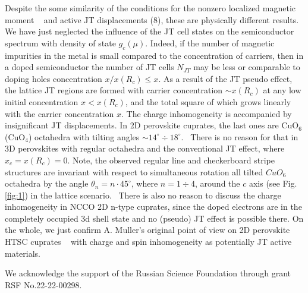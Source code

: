 \documentclass[%
 reprint,
groupedaddress,
 amsmath,amssymb,
 aps,
prb,
]{revtex4-1}
\begin{document}
Despite the some similarity of the conditions for the nonzero localized magnetic moment ~\cite{Anderson1961} and active JT displacements (8), these are physically different results.
We have just neglected the influence of the JT cell states on the semiconductor spectrum with density of state $g_c(\mu)$. Indeed, if the number of magnetic impurities in the metal is small compared to the concentration of carriers, then in a doped semiconductor the number of JT cells $N_{JT}$ may be less or comparable to doping holes concentration $x/x(R_c)\leq x$.  As a result of the JT pseudo effect, the lattice JT regions are formed with carrier concentration $\sim x\left({R_c} \right)$ at any low initial concentration $x < x\left({R_c}\right)$, and the total square of which grows linearly with the carrier concentration $x$.  The charge inhomogeneity is accompanied by insignificant JT displacements. In 2D perovskite cuprates, the last ones are CuO$_6$(CuO$_4$)  octahedra with tilting angles $\sim 14^\circ  \div 18^\circ$.~\cite{Bianconi1996} There is no reason for that in 3D perovskites  with regular octahedra and the conventional JT effect, where $x_c=x\left({R_c} \right)=0$.  Note, the observed regular line and checkerboard stripe structures \cite{Okamoto2012, Seibold2007} are invariant with respect to simultaneous rotation all tilted $CuO_6$ octahedra by the angle $\theta_n = n \cdot 45^\circ$, where $n=1\div 4$, around the $c$ axis (see Fig.\ref{fig:1})  in the lattice scenario.~\cite{Gavrichkov2019, Gavrichkov2022} There is also no reason to discuss the charge inhomogeneity in NCCO 2D n-type cuprates, since the doped electrons are in the completely occupied 3d shell state and no (pseudo) JT effect is possible there. On the whole, we just confirm A. Muller's original point of view on 2D perovskite HTSC cuprates ~\cite{Bussmann2021} with charge and spin inhomogeneity as potentially JT active materials.

\begin{acknowledgments}
We acknowledge the support of the Russian Science Foundation through grant RSF No.22-22-00298.
\end{acknowledgments}

%

\end{document}
